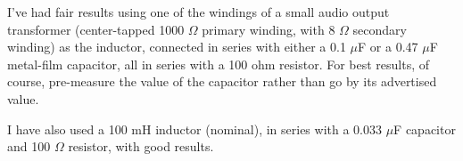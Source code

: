 I've had fair results using one of the windings of a small audio output transformer (center-tapped 1000 $\Omega$ primary winding, with 8 $\Omega$ secondary winding) as the inductor, connected in series with either a 0.1 $\mu$F or a 0.47 $\mu$F metal-film capacitor, all in series with a 100 ohm resistor.  For best results, of course, pre-measure the value of the capacitor rather than go by its advertised value.

I have also used a 100 mH inductor (nominal), in series with a 0.033 $\mu$F capacitor and 100 $\Omega$ resistor, with good results.




